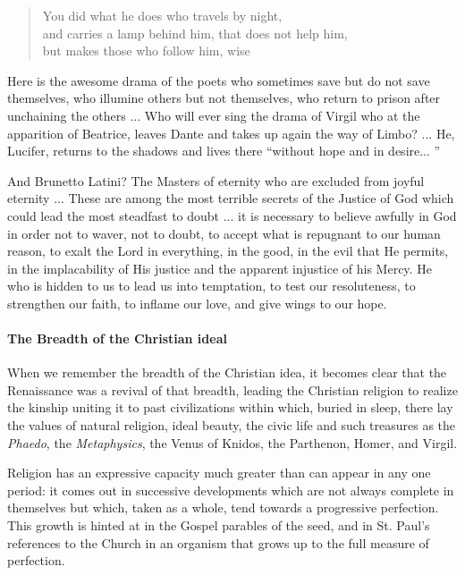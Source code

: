 \begin{quotex}
\begin{verse}
You did what he does who travels by night,\\
and carries a lamp behind him, that does not help him,\\
but makes those who follow him, wise
\end{verse}

\end{quotex}


Here is the awesome drama of the poets who sometimes save but do not save themselves, who illumine others but not themselves, who return to prison after unchaining the others ... Who will ever sing the drama of Virgil who at the apparition of Beatrice, leaves Dante and takes up again the way of Limbo? ... He, Lucifer, returns to the shadows and lives there ``without hope and in desire... ''

And Brunetto Latini? The Masters of eternity who are excluded from joyful eternity ... These are among the most terrible secrets of the Justice of God which could lead the most steadfast to doubt ... it is necessary to believe awfully in God in order not to waver, not to doubt, to accept what is repugnant to our human reason, to exalt the Lord in everything, in the good, in the evil that He permits, in the implacability of His justice and the apparent injustice of his Mercy. He who is hidden to us to lead us into temptation, to test our resoluteness, to strengthen our faith, to inflame our love, and give wings to our hope.

\paragraph{The Breadth of the Christian ideal}


When we remember the breadth of the Christian idea, it becomes clear that the Renaissance was a revival of that breadth, leading the Christian religion to realize the kinship uniting it to past civilizations within which, buried in sleep, there lay the values of natural religion, ideal beauty, the civic life and such treasures as the \emph{Phaedo}, the \emph{Metaphysics}, the Venus of Knidos, the Parthenon, Homer, and Virgil.

Religion has an expressive capacity much greater than can appear in any one period: it comes out in successive developments which are not always complete in themselves but which, taken as a whole, tend towards a progressive perfection. This growth is hinted at in the Gospel parables of the seed, and in St. Paul's references to the Church in an organism that grows up to the full measure of perfection.

